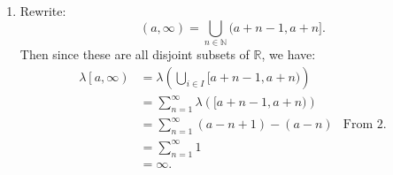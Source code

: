 \documentclass{article}
\begin{document}
\begin{enumerate}
\begin{enumerate}
        \item Rewrite:
    \[
        (a,\infty)=\bigcup_{n\in \mathbb{N}} (a+n-1,a+n]
    .\] 
    Then since these are all disjoint subsets of $\mathbb{R}$, we have:
    \begin{align*}
        \lambda\left[ a,\infty \right) &= \lambda\left( \bigcup_{i \in  I} [a+n-1,a+n) \right)  \\
                                       &= \sum_{n=1}^{\infty} \lambda\left(  [a+n-1,a+n) \right)  \\
                                       &= \sum_{n=1}^{\infty} (a-n+1)-(a-n) &\text{From 2.}\\
                                       &= \sum_{n=1}^{\infty} 1 \\
                                       &= \infty 
    .\end{align*}


\end{enumerate}
\end{enumerate}
\end{document}
